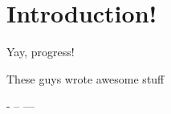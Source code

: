 \section{Introduction!}

Yay, progress!

These guys wrote awesome stuff~\cite{tohidi06:getting,tohidi06:user}

-
-- 
---